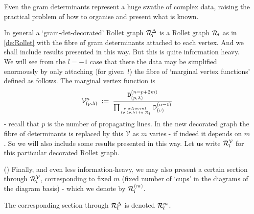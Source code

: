 \documentclass{article}
\newcommand{\ppm}[1]{\textcolor{red}{#1}}
\newcommand{\ppmm}[1]{#1}  %
\newcommand{\bajm}[1]{\textcolor{blue}{#1}}
\newcommand{\bajmm}[1]{#1}
\theoremstyle{definition}
\newcommand{\beq}{\begin{equation}}
\newcommand{\eq}{\end{equation}}
\newcommand{\mdef}{\refstepcounter{theorem}       \medskip \noindent ({\bf \thetheorem}) }
\newcommand{\Deltaa}{\Delta}   %
\newcommand{\Deltt}{{\mathtt D}}   %
\newcommand{\Delttt}[2]{\Deltt^{#1}_{(#2)}}  %
\def\l{\lambda}
\numberwithin{equation}{subsection}
\begin{document}
Even the gram determinants represent a huge swathe of complex data, raising the practical problem 
of how to organise and present what is known. 

\medskip 


\newcommand{\V}{{\mathcal V}}
\newcommand{\RollV}{\Roll^{{\mathcal V}}}
\newcommand{\RollD}{\Roll^{{\Deltaa}}}

In general a `gram-det-decorated' Rollet graph 
$\RollD_l$ 
is a Rollet graph ${\mathcal{R}}_l$ 
as in \ref{de:Rollet}
with the fibre of gram determinants attached to each vertex. 
And we shall include results presented in this way.
But this is quite information heavy. 
We will see from the $l=-1$ case that there the data may be simplified enormously by only attaching (for given~$l$)
the fibre of `marginal vertex functions' defined as follows. 
The marginal vertex function is 
%
\beq  \label{eq:MVF1}
\V^{\bajmm{n}}_{(p.\lambda)} \; \bajmm{:}= \; 
\frac{ \Delttt{(n=p+2m)}{p,\l} }{ \prod_{{v\; adjacent\; \atop to \; (p,\lambda)\; in\;\Roll_l }} \Delttt{(n-1)}{v}}
\eq 
- recall that $p$ is the number of propagating lines.  
In the new decorated graph the fibre of determinants is replaced by this $\V$ as $m$ varies - if indeed it depends on $m$.
\ppmm{So we will also include some results presented in this way.} 
Let us write $\RollV_l$ for this particular decorated Rollet graph. 

\mdef   \label{de:Roll-etc}
Finally, and even less information-heavy, we may also present a certain section through $\RollV_l$,
corresponding to fixed $m$ 
(fixed number of `cups' in the diagrams of the diagram basis) - which we denote by ${\mathcal{R}}^{(m)}_l$.

The corresponding section through $\RollD_l$ is denoted ${\mathcal{R}}^{m}_l$. 

\medskip 
\end{document}
